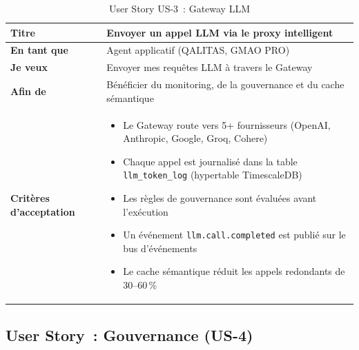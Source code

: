 \begin{table}[H]
\centering
\caption{User Story US-3~: Gateway LLM}
\label{tab:us3}
\begin{tabularx}{\textwidth}{|l|X|}
\hline
\textbf{Titre} & Envoyer un appel LLM via le proxy intelligent \\
\hline
\textbf{En tant que} & Agent applicatif (QALITAS, GMAO PRO) \\
\hline
\textbf{Je veux} & Envoyer mes requêtes LLM à travers le Gateway \\
\hline
\textbf{Afin de} & Bénéficier du monitoring, de la gouvernance et du cache sémantique \\
\hline
\textbf{Critères d'acceptation} & \begin{minipage}[t]{\linewidth}\vspace{2pt}
\begin{itemize}[noitemsep,topsep=0pt]
\item Le Gateway route vers 5+ fournisseurs (OpenAI, Anthropic, Google, Groq, Cohere)
\item Chaque appel est journalisé dans la table \texttt{llm\_token\_log} (hypertable TimescaleDB)
\item Les règles de gouvernance sont évaluées avant l'exécution
\item Un événement \texttt{llm.call.completed} est publié sur le bus d'événements
\item Le cache sémantique réduit les appels redondants de 30--60\,\%
\end{itemize}\vspace{2pt}
\end{minipage} \\
\hline
\end{tabularx}
\end{table}


\subsection{User Story~: Gouvernance (US-4)}

